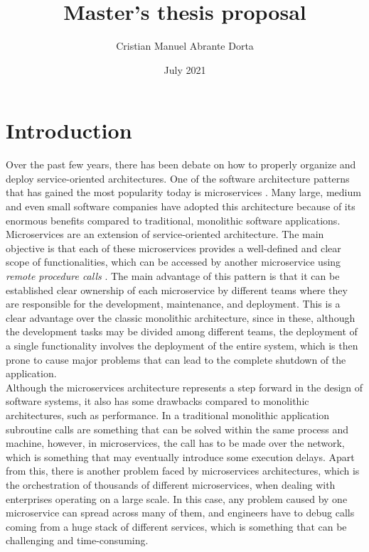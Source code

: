 \documentclass[12pt]{article}
\title{Master's thesis proposal}
\author{Cristian Manuel Abrante Dorta}
\date{July 2021}
\begin{document}
\maketitle

\section{Introduction}

Over the past few years, there has been debate on how to properly organize and deploy service-oriented architectures. One of the software architecture patterns that has gained the most popularity today is microservices \cite{MicroservicesAdoption}. Many large, medium and even small software companies have adopted this architecture because of its enormous benefits compared to traditional, monolithic software applications.\\

Microservices are an extension of service-oriented architecture. The main objective is that each of these microservices provides a well-defined and clear scope of functionalities, which can be accessed by another microservice using \textit{remote procedure calls} \cite{nelson1981remote}. The main advantage of this pattern is that it can be established clear ownership of each microservice by different teams where they are responsible for the development, maintenance, and deployment. This is a clear advantage over the classic monolithic architecture, since in these, although the development tasks may be divided among different teams, the deployment of a single functionality involves the deployment of the entire system, which is then prone to cause major problems that can lead to the complete shutdown of the application.\\

Although the microservices architecture represents a step forward in the design of software systems, it also has some drawbacks compared to monolithic architectures, such as performance. In a traditional monolithic application subroutine calls are something that can be solved within the same process and machine, however, in microservices, the call has to be made over the network, which is something that may eventually introduce some execution delays. Apart from this, there is another problem faced by microservices architectures, which is the orchestration of thousands of different microservices, when dealing with enterprises operating on a large scale. In this case, any problem caused by one microservice can spread across many of them, and engineers have to debug calls coming from a huge stack of different services, which is something that can be challenging and time-consuming.\\
\end{document}
